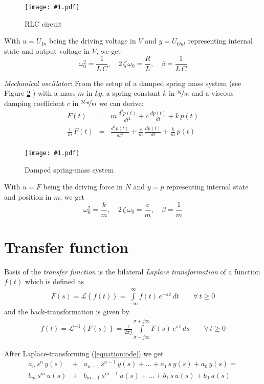 \documentclass[a4paper,12pt]{article}
\newcommand{\Fig}[3]{%
	\begin{figure}[htb]%
	\begin{center}%
	\texttt{[image: \#1.pdf]}%
	\end{center}%
	\caption{#3\label{fig:#1}}%
	\end{figure}%
	}
\newcommand{\FigRef}[1]{%
	Figure \ref{fig:#1}%
	}
\newcommand{\pfrac}[2]{\frac{#1}{#2}}
\newcommand{\Section}[2]{\section{#2}\label{section:#1}}
\newcommand{\ELabel}[1]{\label{equation:#1}}
\newcommand{\ERef}[1]{(\ref{equation:#1})}
\begin{document}
\Fig{elecoscil}{0.5}{RLC circuit}

With $u=U_{In}$ being the driving voltage in $\unit{V}$ and $y=U_{Out}$
representing internal state and output voltage in $\unit{V}$, we get
\begin{equation}
\omega_0^2=\pfrac{1}{L\,C},\quad2\,\zeta\,\omega_0=\pfrac{R}{L},\quad\beta=\pfrac{1}{L\,C}
\end{equation}

{\em Mechanical oscillator}: From the setup of a damped spring mass system
(see \FigRef{mechoscil}) with a mass $m$ in $\unit{kg}$, a spring constant $k$
in $\unitfrac{N}{m}$ and a viscous damping coefficient $c$ in
$\unitfrac{N\cdot s}{m}$ we can derive:
\begin{eqnarray}
F(t)&=&m\,\frac{d^2p(t)}{dt^2}+c\,\frac{dp(t)}{dt}+k\,p(t)\\
\frac{1}{m}\,F(t)&=&\frac{d^2p(t)}{dt^2}+\frac{c}{m}\,\frac{dp(t)}{dt}+\frac{k}{m}\,p(t)\\
\end{eqnarray}

\Fig{mechoscil}{0.5}{Damped spring-mass system}

With $u=F$ being the driving force in $\unit{N}$ and $y=p$ representing
internal state and position in $\unit{m}$, we get
\begin{equation}
\omega_0^2=\pfrac{k}{m},\quad2\,\zeta\,\omega_0=\pfrac{c}{m},\quad\beta=\pfrac{1}{m}
\end{equation}


\Section{xferfunc}{Transfer function}

Basis of the {\em transfer function} is the bilateral {\em Laplace
transformation} of a function $f(t)$ which is defined as
\begin{eqnarray}
F(s)=\mathcal{L}\left\{f(t)\right\}=\int\limits_{-\infty}^{\infty}f(t)\,e^{-s\,t}\,dt\qquad\forall\,t\geq0
\end{eqnarray}
and the back-transformation is given by
\begin{eqnarray}
f(t)=\mathcal{L}^{-1}\left\{F(s)\right\}=\frac{1}{2\pi j}\int\limits_{\sigma-j\infty}^{\sigma+j\infty}F(s)\,e^{s\,t}\,ds\qquad\forall\,t\geq0
\end{eqnarray}

After Laplace-transforming \ERef{ode} we get
\begin{eqnarray}
\ELabel{xfer}
a_{n}\,s^{n}\,y(s)&+&a_{n-1}\,s^{n-1}\,y(s)+\ldots+a_{1}\,s\,y(s)+a_{0}\,y(s)=\nonumber\\
b_{m}\,s^{m}\,u(s)&+&b_{m-1}\,s^{m-1}\,u(s)+\ldots+b_{1}\,s\,u(s)+b_{0}\,u(s)
\end{eqnarray}
\end{document}
